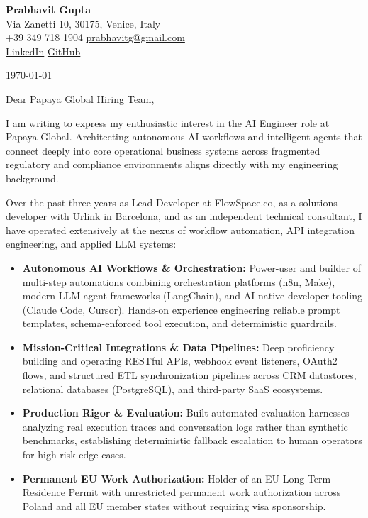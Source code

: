 \documentclass[11pt,a4paper]{article}
\begin{document}
\begin{center}
    {\huge \textbf{Prabhavit Gupta}} \\
    \vspace{4pt}
    Via Zanetti 10, 30175, Venice, Italy \\
    +39 349 718 1904 \textbar{} \href{mailto:prabhavitg@gmail.com}{prabhavitg@gmail.com} \\
    \href{https://www.linkedin.com/in/prabhavit/}{LinkedIn} \textbar{} \href{https://github.com/prab-gupta}{GitHub}
\end{center}

\vspace{10pt}

\noindent \today

\vspace{6pt}

\noindent Dear Papaya Global Hiring Team,

\vspace{6pt}

\noindent I am writing to express my enthusiastic interest in the AI Engineer role at Papaya Global. Architecting autonomous AI workflows and intelligent agents that connect deeply into core operational business systems across fragmented regulatory and compliance environments aligns directly with my engineering background.

\noindent Over the past three years as Lead Developer at FlowSpace.co, as a solutions developer with Urlink in Barcelona, and as an independent technical consultant, I have operated extensively at the nexus of workflow automation, API integration engineering, and applied LLM systems:

\begin{itemize}[leftmargin=*]
    \item \textbf{Autonomous AI Workflows \& Orchestration:} Power-user and builder of multi-step automations combining orchestration platforms (n8n, Make), modern LLM agent frameworks (LangChain), and AI-native developer tooling (Claude Code, Cursor). Hands-on experience engineering reliable prompt templates, schema-enforced tool execution, and deterministic guardrails.
    \item \textbf{Mission-Critical Integrations \& Data Pipelines:} Deep proficiency building and operating RESTful APIs, webhook event listeners, OAuth2 flows, and structured ETL synchronization pipelines across CRM datastores, relational databases (PostgreSQL), and third-party SaaS ecosystems.
    \item \textbf{Production Rigor \& Evaluation:} Built automated evaluation harnesses analyzing real execution traces and conversation logs rather than synthetic benchmarks, establishing deterministic fallback escalation to human operators for high-risk edge cases.
    \item \textbf{Permanent EU Work Authorization:} Holder of an EU Long-Term Residence Permit with unrestricted permanent work authorization across Poland and all EU member states without requiring visa sponsorship.
\end{itemize}
\end{document}
